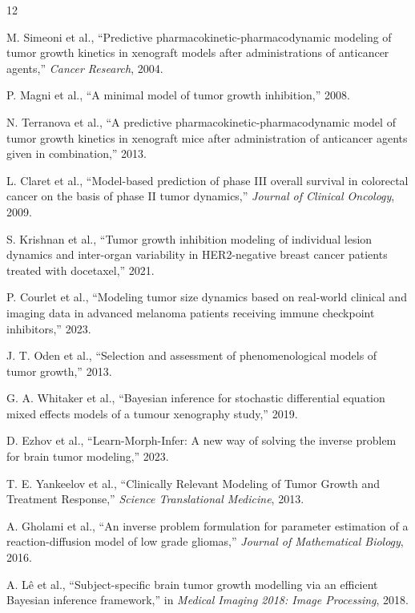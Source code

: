 \documentclass[11pt,a4paper]{article}
\begin{document}
\begin{thebibliography}{12}

M. Simeoni et al., ``Predictive pharmacokinetic-pharmacodynamic modeling of tumor growth kinetics in xenograft models after administrations of anticancer agents,'' \emph{Cancer Research}, 2004.

P. Magni et al., ``A minimal model of tumor growth inhibition,'' 2008.

N. Terranova et al., ``A predictive pharmacokinetic-pharmacodynamic model of tumor growth kinetics in xenograft mice after administration of anticancer agents given in combination,'' 2013.

L. Claret et al., ``Model-based prediction of phase III overall survival in colorectal cancer on the basis of phase II tumor dynamics,'' \emph{Journal of Clinical Oncology}, 2009.

S. Krishnan et al., ``Tumor growth inhibition modeling of individual lesion dynamics and inter-organ variability in HER2-negative breast cancer patients treated with docetaxel,'' 2021.

P. Courlet et al., ``Modeling tumor size dynamics based on real-world clinical and imaging data in advanced melanoma patients receiving immune checkpoint inhibitors,'' 2023.

J. T. Oden et al., ``Selection and assessment of phenomenological models of tumor growth,'' 2013.

G. A. Whitaker et al., ``Bayesian inference for stochastic differential equation mixed effects models of a tumour xenography study,'' 2019.

D. Ezhov et al., ``Learn-Morph-Infer: A new way of solving the inverse problem for brain tumor modeling,'' 2023.

T. E. Yankeelov et al., ``Clinically Relevant Modeling of Tumor Growth and Treatment Response,'' \emph{Science Translational Medicine}, 2013.

A. Gholami et al., ``An inverse problem formulation for parameter estimation of a reaction-diffusion model of low grade gliomas,'' \emph{Journal of Mathematical Biology}, 2016.

A. L\^e et al., ``Subject-specific brain tumor growth modelling via an efficient Bayesian inference framework,'' in \emph{Medical Imaging 2018: Image Processing}, 2018.

\end{thebibliography}
\end{document}
